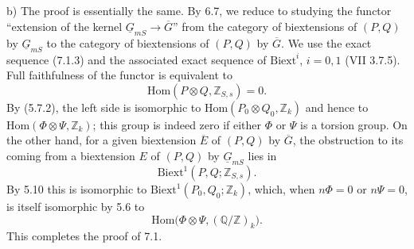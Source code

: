 \smallskip
\noindent b) The proof is essentially the same.  By 6.7, we reduce to
studying the functor ``extension of the kernel
$\underline G_{mS}\to\overline G$'' from the category of biextensions of
$(P,Q)$ by $\underline G_{mS}$ to the category of biextensions of $(P,Q)$ by
$\overline G$.  We use the exact sequence (7.1.3) and the associated exact
sequence of $\mathrm{Biext}^i$, $i=0,1$ (VII 3.7.5).  Full faithfulness of
the functor is equivalent to
\begin{equation}\tag{7.1.7}
 \mathrm{Hom}(P\otimes Q,\mathbb Z_{S,s})=0.
\end{equation}
By (5.7.2), the left side is isomorphic to
$\mathrm{Hom}(P_0\otimes Q_0,\mathbb Z_k)$ and hence to
$\mathrm{Hom}(\Phi\otimes\Psi,\mathbb Z_k)$; this group is indeed zero if
either $\Phi$ or $\Psi$ is a torsion group.  On the other hand, for a given
biextension $\overline E$ of $(P,Q)$ by $\overline G$, the obstruction to
its coming from a biextension $E$ of $(P,Q)$ by $\underline G_{mS}$ lies in
\[
 \mathrm{Biext}^1(P,Q;\mathbb Z_{S,s}).
\]
By 5.10 this is isomorphic to
$\mathrm{Biext}^1(P_0,Q_0;\mathbb Z_k)$, which, when $n\Phi=0$ or
$n\Psi=0$, is itself isomorphic by 5.6 to
\[
 \mathrm{Hom}\bigl(\Phi\otimes\Psi,(\mathbb Q/\mathbb Z)_k\bigr).
\]
This completes the proof of 7.1.

